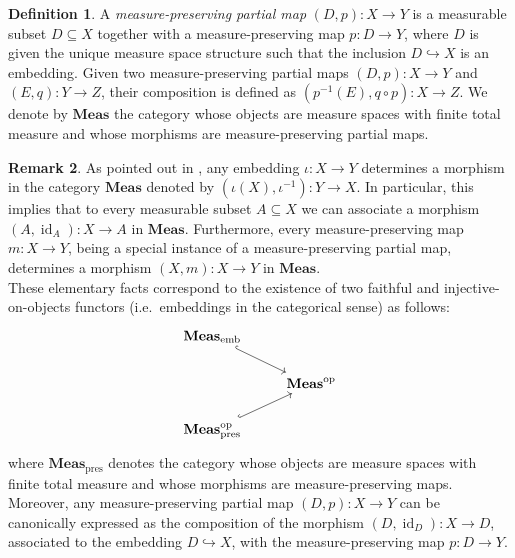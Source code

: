 \documentclass{amsart}
\theoremstyle{definition}
\newtheorem{definition}{Definition}[section]
\newtheorem{remark}[definition]{Remark}
\theoremstyle{plain}
\newcommand{\id}{\operatorname{id}}
\newcommand{\Meas}{\mathbf{Meas}}
\newcommand{\opMeas}{\mathbf{Meas}^\mathrm{op}}
\newcommand{\embMeas}{\mathbf{Meas}_\mathrm{emb}}
\begin{document}
        \begin{definition}
            A \emph{measure-preserving partial map} $(D,p) \colon X \rightarrow Y$ is a measurable subset $D \subseteq X$ together with a measure-preserving map $p \colon D \rightarrow Y$, where $D$ is given the unique measure space structure such that the inclusion $D \hookrightarrow X$ is an embedding.
            Given two measure-preserving partial maps $(D,p) \colon X \rightarrow Y$ and $(E,q) \colon Y \rightarrow Z$, their composition is defined as $\left( p^{-1}(E),q \circ p \right) \colon X \rightarrow Z$.
            We denote by $\Meas$ the category whose objects are measure spaces with finite total measure and whose morphisms are measure-preserving partial maps. 
        \end{definition}

        \begin{remark}
        \label{rem:structure of morphisms in Meas}
            As pointed out in \cite[\S3]{Leinster2023}, any embedding $\iota \colon X \rightarrow Y$ determines a morphism in the category $\Meas$ denoted by $\left( \iota(X),\iota^{-1} \right) \colon Y \rightarrow X$. 
            In particular, this implies that to every measurable subset $A \subseteq X$ we can associate a morphism $(A,\id_A) \colon X \rightarrow A$ in $\Meas$.
            Furthermore, every measure-preserving map $m \colon X \rightarrow Y$, being a special instance of a measure-preserving partial map, determines a morphism $(X,m) \colon X \rightarrow Y$ in $\Meas$. \\
            These elementary facts correspond to the existence of two faithful and injective-on-objects functors (i.e.~embeddings in the categorical sense) as follows: 
            \begin{equation*}
                \begin{tikzcd}
                    \embMeas \ar[dr, hook]      & \\
                            & \opMeas \\
                    \Meas_{\mathrm{pres}}^{\mathrm{op}} \ar[ur, hook]      & 
                \end{tikzcd}
            \end{equation*}
            where $\Meas_{\mathrm{pres}}$ denotes the category whose objects are measure spaces with finite total measure and whose morphisms are measure-preserving maps. \\
            Moreover, any measure-preserving partial map $(D,p) \colon X \rightarrow Y$ can be canonically expressed as the composition of the morphism $(D,\id_D) \colon X \rightarrow D$, associated to the embedding $D \hookrightarrow X$, with the measure-preserving map $p \colon D \rightarrow Y$. \\

\end{remark}
\end{document}
